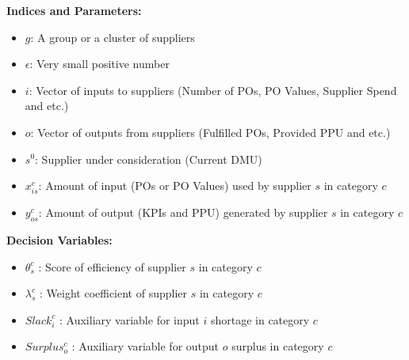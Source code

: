 \documentclass[inte,nonblindrev]{informs3} %
\begin{document}
\begin{APPENDICES}
\noindent \textbf{Indices and Parameters:}
\begin{itemize}
\item[] $g$: A group or a cluster of suppliers
\item[] $\epsilon$: Very small positive number
\item[] $i$: Vector of inputs to suppliers (Number of POs, PO Values, Supplier Spend and etc.)
\item[] $o$: Vector of outputs from suppliers (Fulfilled POs, Provided PPU and etc.)
\item[] $s^0$: Supplier under consideration (Current DMU)
\item[] $x_{is}^c$: Amount of input (POs or PO Values) used by supplier $s$ in category $c$
\item[] $y_{os}^c$: Amount of output (KPIs and PPU) generated by supplier $s$ in category $c$
\end{itemize}

\vspace{.5 cm}

\noindent \textbf{Decision Variables:}
\begin{itemize}
\item[] $\theta_{s}^c$ : Score of efficiency of supplier $s$ in category $c$ 
\item[] $\lambda_{s}^c$ : Weight coefficient of supplier $s$ in category $c$ 
\item[] $Slack_{i}^{c}$ : Auxiliary variable for input $i$ shortage in category $c$
\item[] $Surplus_{o}^{c}$ : Auxiliary variable for output $o$ surplus in category $c$ 
\end{itemize} 


\end{APPENDICES}
\end{document}
